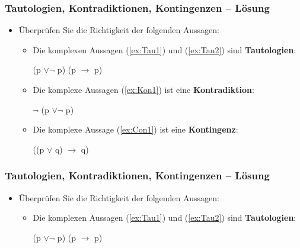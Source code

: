{
\begin{frame}
\frametitle{Tautologien, Kontradiktionen, Kontingenzen -- Lösung}

\begin{itemize}
	\item Überprüfen Sie die Richtigkeit der folgenden Aussagen:
	
	\vspace{1em}
	
	\begin{itemize}
		\item Die komplexen Aussagen (\ref{ex:Tau1}) und (\ref{ex:Tau2}) sind \textbf{Tautologien}:
		
		\eal
		\ex\label{ex:Tau1} (p $\lor \lnot$ p)
		\ex\label{ex:Tau2} (p $\rightarrow$ p)
		\zl
		
		\item Die komplexe Aussagen (\ref{ex:Kon1}) ist eine \textbf{Kontradiktion}:
		
		\eal
		\ex\label{ex:Kon1} $\lnot$ (p $\lor \lnot$ p)
		\zl
		
		\item Die komplexe Aussage (\ref{ex:Con1}) ist eine \textbf{Kontingenz}:
		
		\eal
		\ex\label{ex:Con1} ((p $\lor$ q) $\rightarrow$ q)
		\zl
		
	\end{itemize}	
	
\end{itemize}

\end{frame}


\begin{frame}
\frametitle{Tautologien, Kontradiktionen, Kontingenzen -- Lösung}

\begin{itemize}
	\item Überprüfen Sie die Richtigkeit der folgenden Aussagen:
	
	\begin{itemize}
		\item Die komplexen Aussagen (\ref{ex:Tau1}) und (\ref{ex:Tau2}) sind \textbf{Tautologien}:
		
		\begin{exe}
		 (p $\lor \lnot$ p)
		 (p $\rightarrow$ p)
		\end{exe}
		
	\end{itemize}
\end{itemize}


\end{frame}}
